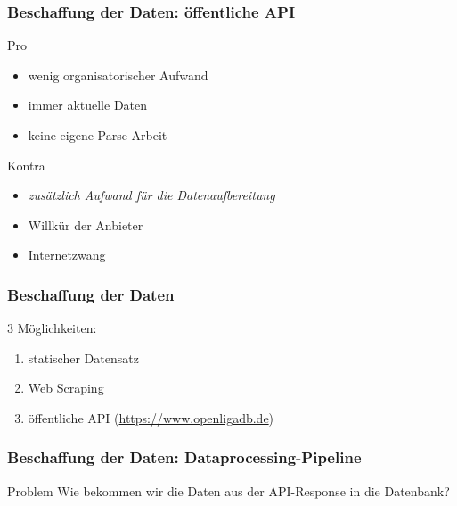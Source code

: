 \documentclass{beamer}
\begin{document}
    \begin{frame}
        \frametitle{Beschaffung der Daten: öffentliche API}
        \begin{exampleblock}{Pro}
            \begin{itemize}
                \item wenig organisatorischer Aufwand
                \item immer aktuelle Daten
                \item keine eigene Parse-Arbeit
            \end{itemize}
        \end{exampleblock}
        \begin{alertblock}{Kontra}
            \begin{itemize}
                \item \textit{zusätzlich Aufwand für die Datenaufbereitung}
                \item Willkür der Anbieter
                \item Internetzwang
            \end{itemize}
        \end{alertblock}
    \end{frame}
    \begin{frame}
        \frametitle{Beschaffung der Daten}
        3 Möglichkeiten:
        \begin{enumerate}
            \item {\color{gray}statischer Datensatz}
            \item {\color{gray}Web Scraping}
            \item öffentliche API (\url{https://www.openligadb.de})
        \end{enumerate}
    \end{frame}
    \begin{frame}
        \frametitle{Beschaffung der Daten: Dataprocessing-Pipeline}
        \begin{alertblock}{Problem}
            Wie bekommen wir die Daten aus der API-Response in die Datenbank?
        \end{alertblock}
    \end{frame}
\end{document}
